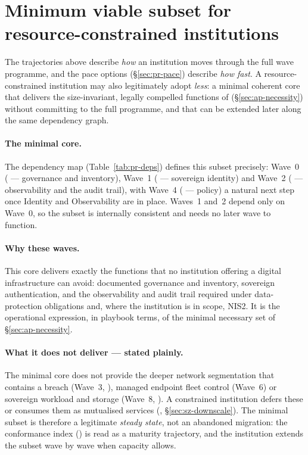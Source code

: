 \section{Minimum viable subset for resource-constrained institutions}
\label{sec:pr-mvs}

The trajectories above describe \emph{how} an institution moves
through the full wave programme, and the pace options
(\S\ref{sec:pr-pace}) describe \emph{how fast}. A resource-constrained
institution may also legitimately adopt \emph{less}: a minimal
coherent core that delivers the size-invariant, legally compelled
functions of 
(\S\ref{sec:ap-necessity}) without committing to the full programme,
and that can be extended later along the same dependency graph.

\paragraph{The minimal core.} The dependency map
(Table~\ref{tab:pr-deps}) defines this subset precisely: Wave~0
( --- governance and inventory),
Wave~1 ( --- sovereign identity) and
Wave~2 ( --- observability and the
audit trail), with Wave~4 ( --- policy) a
natural next step once Identity and Observability are in place.
Waves~1 and~2 depend only on Wave~0, so the subset is internally
consistent and needs no later wave to function.

\paragraph{Why these waves.} This core delivers exactly the functions
that no institution offering a digital infrastructure can avoid:
documented governance and inventory, sovereign authentication, and the
observability and audit trail required under data-protection
obligations and, where the institution is in scope, NIS2. It is the
operational expression, in playbook terms, of the minimal necessary
set of \S\ref{sec:ap-necessity}.

\paragraph{What it does not deliver --- stated plainly.} The minimal
core does not provide the deeper network segmentation that contains a
breach (Wave~3, ), managed endpoint fleet
control (Wave~6) or sovereign workload and storage (Wave~8,
). A constrained institution defers these
or consumes them as mutualised services (,
\S\ref{sec:sz-downscale}). The minimal subset is therefore a
legitimate \emph{steady state}, not an abandoned migration: the
conformance index () is read as a maturity
trajectory, and the institution extends the subset wave by wave when
capacity allows.

